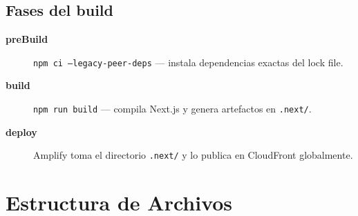 \documentclass[12pt,a4paper]{article}
\begin{document}
\subsection*{Fases del build}

\begin{description}
  \item[\textbf{preBuild}] \texttt{npm ci --legacy-peer-deps} --- instala dependencias exactas del lock file.
  \item[\textbf{build}] \texttt{npm run build} --- compila Next.js y genera artefactos en \texttt{.next/}.
  \item[\textbf{deploy}] Amplify toma el directorio \texttt{.next/} y lo publica en CloudFront globalmente.
\end{description}

\section{Estructura de Archivos}
\end{document}

